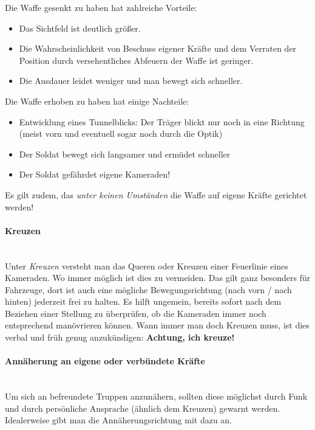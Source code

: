 	Die Waffe gesenkt zu haben hat zahlreiche Vorteile:
	\begin{itemize}
		\item Das Sichtfeld ist deutlich größer.
		\item Die Wahrscheinlichkeit von Beschuss eigener Kräfte und dem Verraten der Position durch versehentliches Abfeuern der Waffe ist geringer.
		\item Die Ausdauer leidet weniger und man bewegt sich schneller.
	\end{itemize}
	Die Waffe erhoben zu haben hat einige Nachteile:
	\begin{itemize}
		\item Entwicklung eines Tunnelblicks: Der Träger blickt nur noch in eine Richtung (meist vorn und eventuell sogar noch durch die Optik)
		\item Der Soldat bewegt sich langsamer und ermüdet schneller
		\item Der Soldat gefährdet eigene Kameraden!
	\end{itemize}
	Es gilt zudem, das \textit{unter keinen Umständen} die Waffe auf eigene Kräfte gerichtet werden!

	\paragraph{Kreuzen}\hfil\\
		Unter \textit{Kreuzen} versteht man das Queren oder Kreuzen einer Feuerlinie eines Kameraden. Wo immer möglich ist dies zu vermeiden. Das gilt ganz besonders für Fahrzeuge, dort ist auch eine mögliche Bewegungsrichtung (nach vorn / nach hinten) jederzeit frei zu halten. Es hilft ungemein, bereits sofort nach dem Beziehen einer Stellung zu überprüfen, ob die Kameraden immer noch entsprechend manövrieren können. Wann immer man doch Kreuzen muss, ist dies verbal und früh genug anzukündigen: \textbf{\glqq Achtung, ich kreuze!\grqq}

	\paragraph{Annäherung an eigene oder verbündete Kräfte}\hfil\\
		Um sich an befreundete Truppen anzunähern, sollten diese möglichst durch Funk und durch persönliche Ansprache (ähnlich dem Kreuzen) gewarnt werden. Idealerweise gibt man die Annäherungsrichtung mit dazu an.

